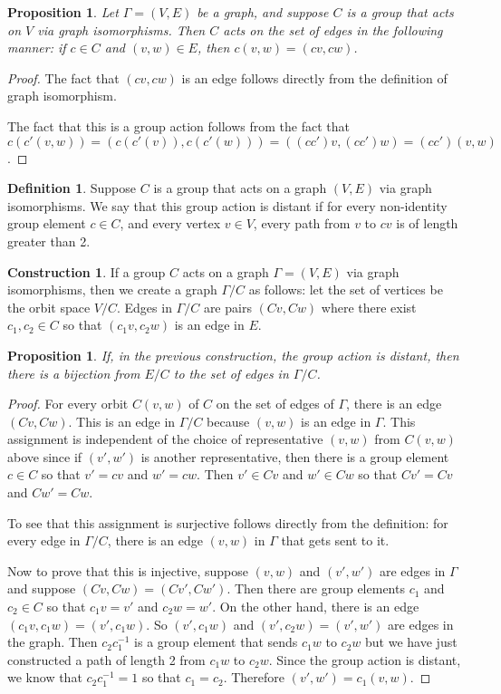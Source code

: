 \documentclass[12pt,twoside,singlespace]{article}
\numberwithin{equation}{section}
\newtheorem{prop}[equation]{Proposition}
\theoremstyle{definition}
\newtheorem{definition}[equation]{Definition}
\newtheorem{construction}[equation]{Construction}
\begin{document}
\begin{prop}
Let $\Gamma=(V,E)$ be a graph, and suppose $C$ is a group that acts on $V$ via graph isomorphisms.  Then $C$ acts on the set of edges in the following manner: if $c\in C$ and $(v,w)\in E$, then $c(v,w)=(cv,cw)$.
\end{prop}
\begin{proof}
The fact that $(cv,cw)$ is an edge follows directly from the definition of graph isomorphism.

The fact that this is a group action follows from the fact that $c(c'(v,w))=(c(c'(v)),c(c'(w)))=((cc')v,(cc')w)=(cc')(v,w)$.
\end{proof}

\begin{definition}
Suppose $C$ is a group that acts on a graph $(V,E)$ via graph isomorphisms.  We say that this group action is distant if for every non-identity group element $c\in C$, and every vertex $v\in V$, every path from $v$ to $cv$ is of length greater than 2.
\end{definition}

\begin{construction}
If a group $C$ acts on a graph $\Gamma=(V,E)$ via graph isomorphisms, then we create a graph $\Gamma/C$ as follows: let the set of vertices be the orbit space $V/C$.  Edges in $\Gamma/C$ are pairs $(Cv,Cw)$ where there exist $c_1, c_2\in C$ so that $(c_1v,c_2w)$ is an edge in $E$.
\end{construction}

\begin{prop}
\label{prop:distiso}
If, in the previous construction, the group action is distant, then there is a bijection from $E/C$ to the set of edges in $\Gamma/C$.
\end{prop}
\begin{proof}
For every orbit $C(v,w)$ of $C$ on the set of edges of $\Gamma$, there is an edge $(Cv,Cw)$.  This is an edge in $\Gamma/C$ because $(v,w)$ is an edge in $\Gamma$.  This assignment is independent of the choice of representative $(v,w)$ from $C(v,w)$ above since if $(v',w')$ is another representative, then there is a group element $c\in C$ so that $v'=cv$ and $w'=cw$.  Then $v'\in Cv$ and $w'\in Cw$ so that $Cv'=Cv$ and $Cw'=Cw$.

To see that this assignment is surjective follows directly from the definition: for every edge in $\Gamma/C$, there is an edge $(v,w)$ in $\Gamma$ that gets sent to it.

Now to prove that this is injective, suppose $(v,w)$ and $(v',w')$ are edges in $\Gamma$ and suppose $(Cv,Cw)=(Cv',Cw')$.  Then there are group elements $c_1$ and $c_2\in C$ so that $c_1v=v'$ and $c_2w=w'$.  On the other hand, there is an edge $(c_1v,c_1w)=(v',c_1w)$.  So $(v',c_1w)$ and $(v',c_2w)=(v',w')$ are edges in the graph.  Then $c_2c_1^{-1}$ is a group element that sends $c_1w$ to $c_2w$ but we have just constructed a path of length 2 from $c_1w$ to $c_2w$.  Since the group action is distant, we know that $c_2c_1^{-1}=1$ so that $c_1=c_2$.  Therefore $(v',w')=c_1(v,w)$.
\end{proof}
\end{document}
